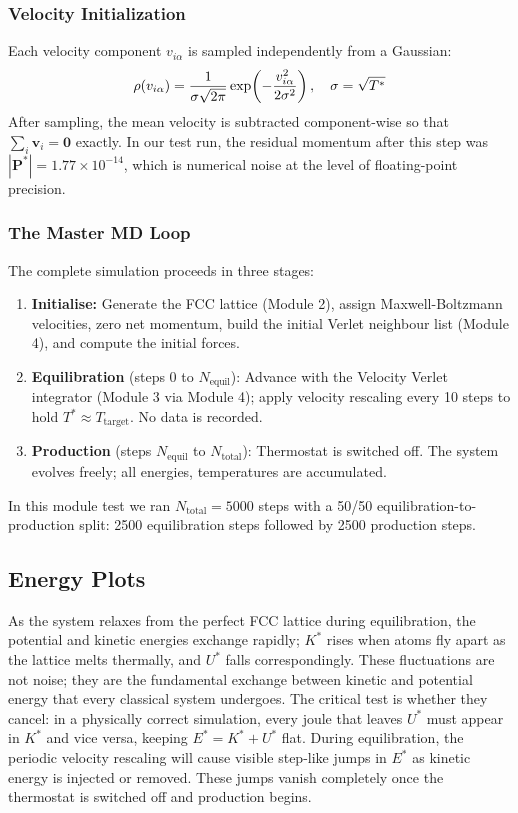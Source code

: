 \subsubsection{Velocity Initialization}

Each velocity component $v_{i\alpha}$ is sampled independently from a Gaussian:
\begin{equation}
    \rho(v_{i\alpha}) = \frac{1}{\sigma\sqrt{2\pi}}\exp\!\left(-\frac{v_{i\alpha}^2}{2\sigma^2}\right),
    \quad \sigma = \sqrt{T^{*}}
    \label{eq:mb}
\end{equation}
After sampling, the mean velocity is subtracted component-wise so that $\sum_i \mathbf{v}_i = \mathbf{0}$ exactly. In our test run, the residual momentum after this step was $|\mathbf{P}^*| = 1.77 \times 10^{-14}$, which is numerical noise at the level of floating-point precision.

\subsubsection{The Master MD Loop}

The complete simulation proceeds in three stages:

\begin{enumerate}
    \item \textbf{Initialise:} Generate the FCC lattice (Module 2), assign Maxwell-Boltzmann velocities, zero net momentum, build the initial Verlet neighbour list (Module 4), and compute the initial forces.
    \item \textbf{Equilibration} (steps 0 to $N_{\text{equil}}$): Advance with the Velocity Verlet integrator (Module 3 via Module 4); apply velocity rescaling every 10 steps to hold $T^* \approx T_{\text{target}}$. No data is recorded.
    \item \textbf{Production} (steps $N_{\text{equil}}$ to $N_{\text{total}}$): Thermostat is switched off. The system evolves freely; all energies, temperatures are accumulated.
\end{enumerate}

In this module test we ran $N_{\text{total}} = 5000$ steps with a 50/50 equilibration-to-production split: 2500 equilibration steps followed by 2500 production steps.

\subsection{Energy Plots}

As the system relaxes from the perfect FCC lattice during equilibration, the potential and kinetic energies exchange rapidly; $K^*$ rises when atoms fly apart as the lattice melts thermally, and $U^*$ falls correspondingly. These fluctuations are not noise; they are the fundamental exchange between kinetic and potential energy that every classical system undergoes. The critical test is whether they cancel: in a physically correct simulation, every joule that leaves $U^*$ must appear in $K^*$ and vice versa, keeping $E^* = K^* + U^*$ flat. During equilibration, the periodic velocity rescaling will cause visible step-like jumps in $E^*$ as kinetic energy is injected or removed. These jumps vanish completely once the thermostat is switched off and production begins.

